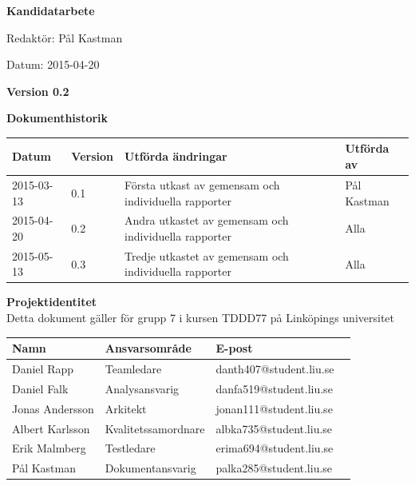 \documentclass{article}
\begin{document}

\begin{titlepage}
\begin{center}
  \textbf{\Huge Kandidatarbete}
\end{center}
\begin{center}
  {\Large Redaktör: Pål Kastman}
\end{center}
\begin{center}
  {\Large Datum: 2015-04-20}
\end{center}
\begin{center}
  {\Large \textbf{Version 0.2}}
\end{center}
\end{titlepage}
\newpage
\begin{flushleft}
  {\Large \textbf{Dokumenthistorik}}\\[0.5ex]
  \begin{center}
    \begin{tabular}{ | l | l | p{5cm} | l |}
    \hline
    \textbf{Datum} & \textbf{Version} & \textbf{Utförda ändringar} & \textbf{Utförda av} \\ \hline
    2015-03-13 & 0.1 & Första utkast av gemensam och individuella rapporter & Pål Kastman \\ \hline
    2015-04-20 & 0.2 & Andra utkastet av gemensam och individuella rapporter & Alla \\ \hline
    2015-05-13 & 0.3 & Tredje utkastet av gemensam och individuella rapporter & Alla \\ \hline
    \end{tabular}
  \end{center}
\end{flushleft}

\hfill

\begin{flushleft}
  {\Large \textbf{Projektidentitet}}\\[0.5ex]
  {\small} Detta dokument gäller för grupp 7  i kursen TDDD77 på Linköpings universitet
  \begin{center}
    \begin{tabular}{ | l | l | p{5cm} | l |}
    \hline
    \textbf{Namn} & \textbf{Ansvarsområde} & \textbf{E-post} \\ \hline
    Daniel Rapp & Teamledare & danth407@student.liu.se \\ \hline
    Daniel Falk & Analysansvarig & danfa519@student.liu.se \\ \hline
    Jonas Andersson & Arkitekt & jonan111@student.liu.se \\ \hline
    Albert Karlsson & Kvalitetssamordnare & albka735@student.liu.se \\ \hline
    Erik Malmberg & Testledare & erima694@student.liu.se \\ \hline
    Pål Kastman & Dokumentansvarig & palka285@student.liu.se \\ \hline
    \end{tabular}
\end{center}
\end{flushleft}
\end{document}
